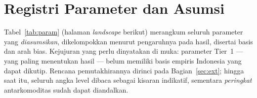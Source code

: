 \documentclass[11pt,a4paper]{article}
\newcommand{\en}[1]{\textit{#1}}   %
\begin{document}
\section{Registri Parameter dan Asumsi}
\label{sec:param}

Tabel~\ref{tab:param} (halaman \en{landscape} berikut) merangkum seluruh
parameter yang \emph{diasumsikan}, dikelompokkan menurut pengaruhnya pada
hasil, disertai basis dan arah bias. Kejujuran yang perlu dinyatakan di
muka: parameter Tier~1 --- yang paling menentukan hasil --- belum memiliki
basis empiris Indonesia yang dapat dikutip. Rencana pemutakhirannya
dirinci pada Bagian~\ref{sec:ext}; hingga saat itu, seluruh angka level
dibaca sebagai kisaran indikatif, sementara \emph{peringkat} antarkomoditas
sudah dapat diandalkan.
\end{document}
